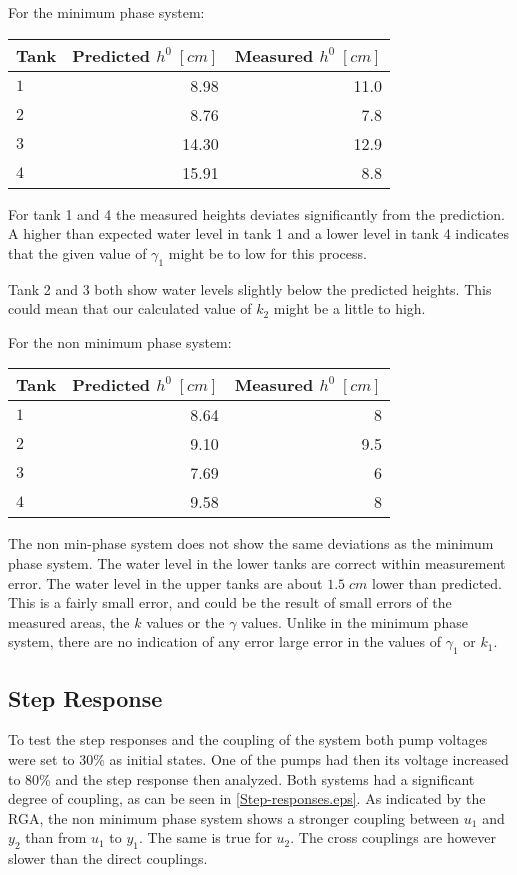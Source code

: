 \documentclass[a4paper,12pt,oneside,onecolumn]{article}
\begin{document}
For the minimum phase system:
\begin{center}
    \begin{tabular}{|l|r||r|}
    Tank & Predicted $h^0 \; [cm]$ & Measured $h^0 \; [cm]$ \\
    \hline
    $1$ & 8.98 & 11.0\\
    $2$ & 8.76 & 7.8\\
    $3$ & 14.30 & 12.9\\
    $4$ & 15.91 & 8.8\\
    
    \end{tabular}
\end{center}

For tank 1 and 4 the measured heights deviates significantly from the prediction. A higher than expected water level in tank 1 and  a lower level in tank 4 indicates that the given value of $\gamma_1$ might be to low for this process.

Tank 2 and 3 both show water levels slightly below the predicted heights. This could mean that our calculated value of $k_2$ might be a little to high.  


For the non minimum phase system:
\begin{center}
    \begin{tabular}{|l|r||r|}
    Tank & Predicted $h^0 \; [cm]$ & Measured $h^0 \; [cm]$ \\
    \hline
    $1$ & 8.64 & 8\\
    $2$ & 9.10 & 9.5\\
    $3$ & 7.69 & 6\\
    $4$ & 9.58 & 8\\
    \end{tabular}
\end{center}

The non min-phase system does not show the same deviations as the minimum phase system. The water level in the lower tanks are correct within measurement error. The water level in the upper tanks are about $1.5 \;cm$ lower than predicted. This is a fairly small error, and could be the result of small errors of the measured areas, the $k$ values or the $\gamma$ values. Unlike in the minimum phase system, there are  no indication of any error large error in the values of $\gamma_1$ or $k_1.$

\subsection{Step Response}
To test the step responses and the coupling of the system both pump voltages were set to 30\% as initial states. One of the pumps had then its voltage increased to 80\% and the step response then analyzed. Both systems had a significant degree of coupling, as can be seen in \ref{Step-responses.eps}. As indicated by the RGA, the non minimum phase system shows a stronger coupling between $u_1$ and $y_2$ than from $u_1$ to $y_1.$ The same is true for $u_2.$ The cross couplings are however slower than the direct couplings. 
\end{document}
